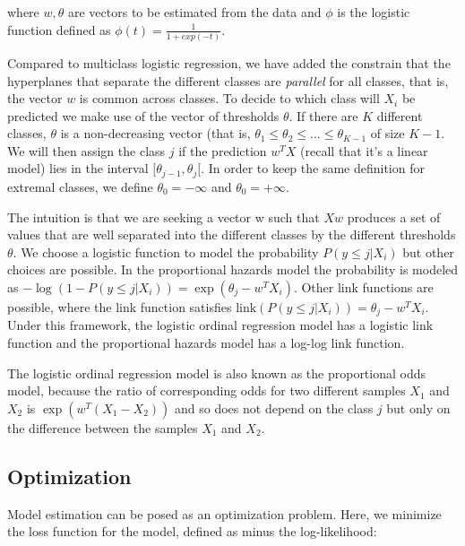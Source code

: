 where $w,\theta$ are vectors to be estimated from the data and $\phi$ is the logistic function defined as $\phi(t)=\frac{1}{1+exp(−t)}$.


Compared to multiclass logistic regression, we have added the constrain that the hyperplanes that separate the different classes are \emph{parallel} for all classes, that is, the vector $w$ is common across classes. To decide to which class will $X_i$ be predicted we make use of the vector of thresholds $\theta$. If there are $K$ different classes, $\theta$ is a non-decreasing vector (that is, ${\theta _1} \leq {\theta _2} \leq ... \leq {\theta _{K - 1}}$
 of size $K−1$. We will then assign the class $j$ if the prediction $w^T X$ (recall that it's a linear model) lies in the interval $[\theta_{j−1},\theta_j[$. In order to keep the same definition for extremal classes, we define $\theta _0 =  - \infty $ and $\theta_0 = + \infty$.

The intuition is that we are seeking a vector w such that $Xw$ produces a set of values that are well separated into the different classes by the different thresholds $\theta$. We choose a logistic function to model the probability $P(y \leq j|X_i)$ but other choices are possible. In the proportional hazards model \cite{McCullagh1980} the probability is modeled as $-\log(1 - P(y \leq j | X_i)) = \exp(\theta_j - w^T
X_i)$. Other link functions are possible, where the link function satisfies $\text{link}(P(y \leq j | X_i)) = \theta_j - w^T X_i$. Under this framework, the logistic ordinal regression model has a logistic link function and the proportional hazards model has a log-log link function.

The logistic ordinal regression model is also known as the proportional odds model, because the ratio of corresponding odds for two different samples $X_1$ and $X_2$ is $\exp(w^T(X_1 - X_2))$ and so does not depend on the class $j$ but only on the difference between the samples $X_1$ and $X_2$.

\subsection{Optimization}

Model estimation can be posed as an optimization problem. Here, we minimize the loss function for the model, defined as minus the log-likelihood:

